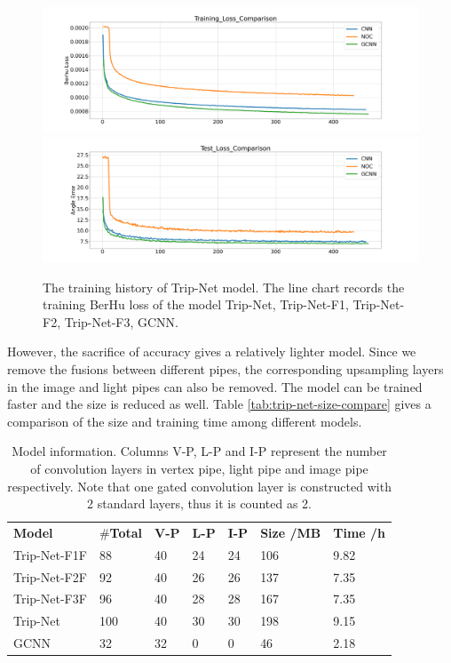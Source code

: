 \documentclass[border=15pt, multi, tikz]{article}
\newcommand{\tabhead}[1]{\textbf{#1}}
\begin{document}
\begin{figure}[th]
	\centering
	\includegraphics[width=.45\textwidth]{./Figures/gcnn_training_loss.png}
	\includegraphics[width=.45\textwidth]{./Figures/gcnn_eval_loss.png}
	\caption{The training history of Trip-Net model. The line chart records the training BerHu loss of the model Trip-Net, Trip-Net-F1, Trip-Net-F2, Trip-Net-F3, GCNN.}
	\label{fig:trip-net-training-history}
\end{figure}

However, the sacrifice of accuracy gives a relatively lighter model. Since we remove the fusions between different pipes, the corresponding upsampling layers in the image and light pipes can also be removed. The model can be trained faster and the size is reduced as well. Table \ref{tab:trip-net-size-compare} gives a comparison of the size and training time among different models.


\begin{table}[H]
	
	\centering
	\begin{tabular}{l l l l l l l }
		\tabhead{Model} & $ \# $\textbf{Total} &\textbf{ V-P} & \textbf{L-P} & \textbf{I-P} & \tabhead{Size /MB} & \tabhead{Time /h}\\
		Trip-Net-F1F  			& 88 &  40 & 24 & 24 & 106  &  9.82\\ 
		\hline
		Trip-Net-F2F 			& 92 & 40 & 26 & 26 & 137 &  7.35\\ 
		\hline
		Trip-Net-F3F 			& 96 & 40 & 28 & 28 & 167 &  7.35\\
		\hline
		Trip-Net 				& 100 & 40 & 30 & 30 & 198 & 9.15\\
		\hline
		GCNN 					& 32 & 32 & 0 & 0 & 46 & 2.18\\
	\end{tabular}
	\caption{Model information. Columns V-P, L-P and I-P represent the number of convolution layers in vertex pipe, light pipe and image pipe respectively. Note that one gated convolution layer is constructed with 2 standard layers, thus it is counted as 2. }	
	\label{tab:gcnn-eval-mean}
\end{table}
\end{document}
